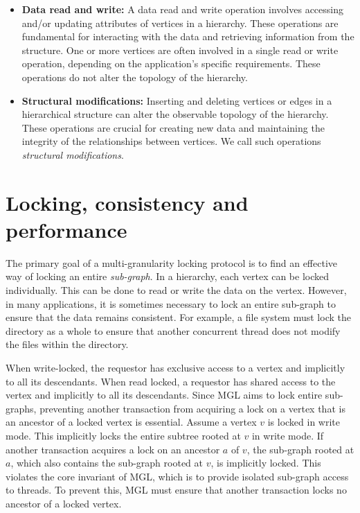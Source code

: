 \begin{itemize}

    
    \item \textbf{Data read and write:} A data read and write operation involves accessing and/or updating attributes of vertices in a hierarchy. These operations are fundamental for interacting with the data and retrieving information from the structure. One or more vertices are often involved in a single read or write operation, depending on the application's specific requirements. These operations do not alter the topology of the hierarchy.

    \item \textbf{Structural modifications:} Inserting and deleting vertices or edges in a hierarchical structure can alter the observable topology of the hierarchy. These operations are crucial for creating new data and maintaining the integrity of the relationships between vertices. We call such operations \emph{structural modifications}.
    

\end{itemize}

\section{Locking, consistency and performance}
The primary goal of a multi-granularity locking protocol is to find an effective way of locking an entire \emph{sub-graph}. In a hierarchy, each vertex can be locked individually. This can be done to read or write the data on the vertex. However, in many applications, it is sometimes necessary to lock an entire sub-graph to ensure that the data remains consistent. For example, a file system must lock the directory as a whole to ensure that another concurrent thread does not modify the files within the directory.


When write-locked, the requestor has exclusive access to a vertex and implicitly to all its descendants. When read locked, a requestor has shared access to the vertex and implicitly to all its descendants. Since MGL aims to lock entire sub-graphs, preventing another transaction from acquiring a lock on a vertex that is an ancestor of a locked vertex is essential. Assume a vertex $v$ is locked in write mode. This implicitly locks the entire subtree rooted at $v$ in write mode. If another transaction acquires a lock on an ancestor $a$ of $v$, the sub-graph rooted at $a$, which also contains the sub-graph rooted at $v$, is implicitly locked. This violates the core invariant of MGL, which is to provide isolated sub-graph access to threads. To prevent this, MGL must ensure that another transaction locks no ancestor of a locked vertex. 

